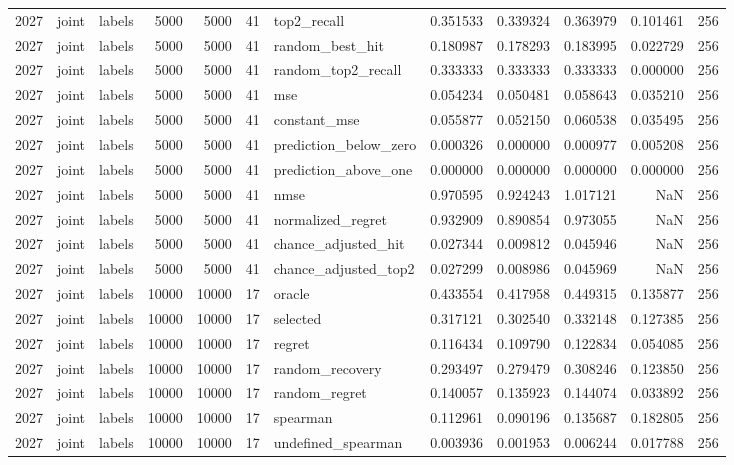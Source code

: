 \begin{tabular}{rllrrrlrrrrr}
2027 & joint & labels & 5000 & 5000 & 41 & top2_recall & 0.351533 & 0.339324 & 0.363979 & 0.101461 & 256 \\
2027 & joint & labels & 5000 & 5000 & 41 & random_best_hit & 0.180987 & 0.178293 & 0.183995 & 0.022729 & 256 \\
2027 & joint & labels & 5000 & 5000 & 41 & random_top2_recall & 0.333333 & 0.333333 & 0.333333 & 0.000000 & 256 \\
2027 & joint & labels & 5000 & 5000 & 41 & mse & 0.054234 & 0.050481 & 0.058643 & 0.035210 & 256 \\
2027 & joint & labels & 5000 & 5000 & 41 & constant_mse & 0.055877 & 0.052150 & 0.060538 & 0.035495 & 256 \\
2027 & joint & labels & 5000 & 5000 & 41 & prediction_below_zero & 0.000326 & 0.000000 & 0.000977 & 0.005208 & 256 \\
2027 & joint & labels & 5000 & 5000 & 41 & prediction_above_one & 0.000000 & 0.000000 & 0.000000 & 0.000000 & 256 \\
2027 & joint & labels & 5000 & 5000 & 41 & nmse & 0.970595 & 0.924243 & 1.017121 & NaN & 256 \\
2027 & joint & labels & 5000 & 5000 & 41 & normalized_regret & 0.932909 & 0.890854 & 0.973055 & NaN & 256 \\
2027 & joint & labels & 5000 & 5000 & 41 & chance_adjusted_hit & 0.027344 & 0.009812 & 0.045946 & NaN & 256 \\
2027 & joint & labels & 5000 & 5000 & 41 & chance_adjusted_top2 & 0.027299 & 0.008986 & 0.045969 & NaN & 256 \\
2027 & joint & labels & 10000 & 10000 & 17 & oracle & 0.433554 & 0.417958 & 0.449315 & 0.135877 & 256 \\
2027 & joint & labels & 10000 & 10000 & 17 & selected & 0.317121 & 0.302540 & 0.332148 & 0.127385 & 256 \\
2027 & joint & labels & 10000 & 10000 & 17 & regret & 0.116434 & 0.109790 & 0.122834 & 0.054085 & 256 \\
2027 & joint & labels & 10000 & 10000 & 17 & random_recovery & 0.293497 & 0.279479 & 0.308246 & 0.123850 & 256 \\
2027 & joint & labels & 10000 & 10000 & 17 & random_regret & 0.140057 & 0.135923 & 0.144074 & 0.033892 & 256 \\
2027 & joint & labels & 10000 & 10000 & 17 & spearman & 0.112961 & 0.090196 & 0.135687 & 0.182805 & 256 \\
2027 & joint & labels & 10000 & 10000 & 17 & undefined_spearman & 0.003936 & 0.001953 & 0.006244 & 0.017788 & 256 \\

\end{tabular}
